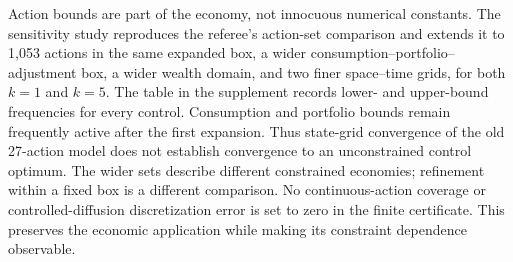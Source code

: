 Action bounds are part of the economy, not innocuous numerical constants. The sensitivity study reproduces the referee's action-set comparison and extends it to 1,053 actions in the same expanded box, a wider consumption--portfolio--adjustment box, a wider wealth domain, and two finer space--time grids, for both $k=1$ and $k=5$. The table in the supplement records lower- and upper-bound frequencies for every control. Consumption and portfolio bounds remain frequently active after the first expansion. Thus state-grid convergence of the old 27-action model does not establish convergence to an unconstrained control optimum. The wider sets describe different constrained economies; refinement within a fixed box is a different comparison. No continuous-action coverage or controlled-diffusion discretization error is set to zero in the finite certificate. This preserves the economic application while making its constraint dependence observable.
